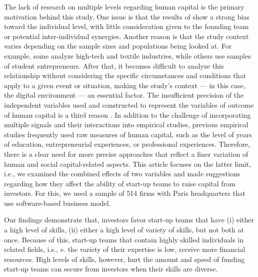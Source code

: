 \documentclass[12pt]{article}
\begin{document}
The lack of research on multiple levels regarding human capital is the primary motivation behind this study. One issue is that the results of \citep{marvel2016human} show a strong bias toward the individual level, with little consideration given to the founding team or potential inter-individual synergies. Another reason is that the study context varies depending on the sample sizes and populations being looked at. For example, some analyze high-tech and textile industries, while others use samples of student entrepreneurs. After that, it becomes difficult to analyze this relationship without considering the specific circumstances and conditions that apply to a given event or situation, making the study's context — in this case, the digital environment — an essential factor. The insufficient precision of the independent variables used and constructed to represent the variables of outcome of human capital is a third reason \citep{harrison2007s}. In addition to the challenge of incorporating multiple signals and their interactions into empirical studies, previous empirical studies frequently used raw measures of human capital, such as the level of years of education, entrepreneurial experiences, or professional experiences. Therefore, there is a clear need for more precise approaches that reflect a finer variation of human and social capital-related aspects. This article focuses on the latter limit, i.e., we examined the combined effects of two variables and made suggestions regarding how they affect the ability of start-up teams to raise capital from investors. For this, we used a sample of 514 firms with Paris headquarters that use software-based business model.

Our findings demonstrate that, investors favor start-up teams that have (i) either a high level of skills, (ii) either a high level of variety of skills, but not both at once. Because of this, start-up teams that contain highly skilled individuals in related fields, i.e., e. the variety of their expertise is low, receive more financial resources. High levels of skills, however, hurt the amount and speed of funding start-up teams can secure from investors when their skills are diverse.
\end{document}
